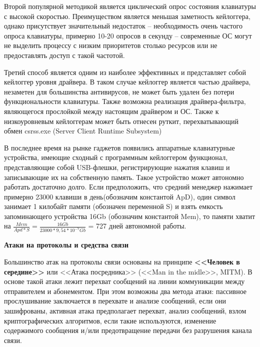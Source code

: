 	
	Второй популярной методикой является циклический опрос состояния клавиатуры с высокой скоростью. Преимуществом является меньшая заметность кейлоггера, однако присутствует значительный недостаток -- необходимость очень частого опроса клавиатуры, примерно 10-20 опросов в секунду -- современные ОС могут не выделить процессу с низким приоритетов столько ресурсов или не предоставлять доступ с такой частотой. 
	
	Третий способ является одним из наиболее эффективных и представляет собой кейлоггер уровня драйвера. В таком случае кейлоггер является частью драйвера, незаметен для большинства антивирусов, не может быть удален без потери функциональности клавиатуры. Также возможна реализация драйвера-фильтра, являющегося прослойкой между настоящим драйвером и ОС. Также к низкоуровневым кейлоггерам может быть отнесен руткит, перехватывающий обмен  csrss.exe (Server Client Runtime Subsystem)
	
	В последнее время на рынке гаджетов появились аппаратные клавиатурные устройства, имеющие сходный с программным кейлоггером   функционал, представляющие собой USB-флешки, регистрирующие нажатия клавиш и записывающие их на собственную память. Такое устройство может автономно работать достаточно долго. Если предположить, что средний менеджер нажимает примерно 23000 клавиши в день(обозначим константой ApD), один символ занимает 1 килобайт памяти (обозначен переменной  S) %
	и взять емкость запоминающего устройства 16Gb (обозначим константой Mem), то памяти хватит на $ \frac{Mem}{Apd * S } = \frac{16 Gb}{23000*9,54*10^{-7} Gb} $ = 727 дней автономной работы. 
	
	\textbf{Атаки на протоколы и средства связи}
	
	
	Большинство атак на протоколы связи основаны на принципе \textbf{<<Человек в середине>>} или <<Атака посредника>>  (<<Man in the midle>>, MITM). В основе такой атаки лежит перехват сообщений на линии коммуникации между отправителем  и абонементом.  При этом возможны два метода атаки: пассивное прослушивание заключается в перехвате и анализе сообщений, если они зашифрованы, активная атака предполагает перехват, анализ сообщений, взлом криптографических алгоритмов, если такие используются, изменение содержимого сообщения и/или предотвращение передачи без разрушения канала связи. 
	
